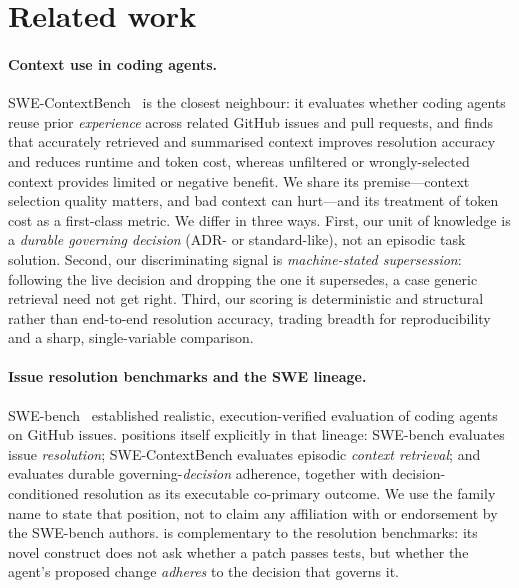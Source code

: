 \section{Related work}

\paragraph{Context use in coding agents.}
SWE-ContextBench~\citep{swecontextbench2026} is the closest neighbour: it
evaluates whether coding agents reuse prior \emph{experience} across related
GitHub issues and pull requests, and finds that accurately retrieved and
summarised context improves resolution accuracy and reduces runtime and token
cost, whereas unfiltered or wrongly-selected context provides limited or negative
benefit. We share its premise---context selection quality matters, and bad
context can hurt---and its treatment of token cost as a first-class metric. We
differ in three ways. First, our unit of knowledge is a \emph{durable governing
decision} (ADR- or standard-like), not an episodic task solution. Second, our
discriminating signal is \emph{machine-stated supersession}: following the live
decision and dropping the one it supersedes, a case generic retrieval need not
get right. Third, our scoring is deterministic and structural rather than
end-to-end resolution accuracy, trading breadth for reproducibility and a sharp,
single-variable comparison.

\paragraph{Issue resolution benchmarks and the SWE lineage.}
SWE-bench~\citep{swebench} established realistic, execution-verified evaluation of
coding agents on GitHub issues. \benchname{} positions itself explicitly in that
lineage: SWE-bench evaluates issue \emph{resolution}; SWE-ContextBench
\citep{swecontextbench2026} evaluates episodic \emph{context retrieval}; and
\benchname{} evaluates durable governing-\emph{decision} adherence, together
with decision-conditioned resolution as its executable co-primary outcome. We
use the family name to state that position, not to claim any affiliation with or
endorsement by the SWE-bench authors. \benchname{} is complementary to the
resolution benchmarks: its novel construct does not ask whether a patch passes
tests, but whether the agent's proposed change \emph{adheres} to the decision
that governs it.

